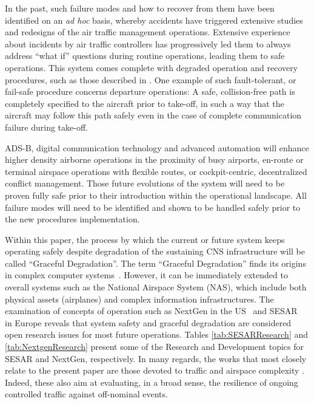 \documentclass[a4paper, 10pt]{IEEEtran}
\begin{document}
In the past, such failure modes and how to recover from them have been
identified on an {\em ad hoc} basis, whereby accidents have triggered
extensive studies and redesigns of the air traffic management operations.
Extensive experience about incidents by air traffic controllers has
progressively led them to always address ``what if'' questions during
routine operations, leading them to safe operations. This system comes
complete with degraded operation and recovery procedures, such as those
described in \cite{ICAO4444}. One example of such fault-tolerant, or fail-safe
procedure concerns departure operations: A safe, collision-free path is
completely specified to the aircraft prior to take-off, in such a way that
the aircraft may follow this path safely even in the case of complete
communication failure during take-off.


ADS-B, digital communication technology and advanced automation will enhance  higher density airborne operations
in the proximity of busy airports, en-route or terminal airspace operations
with flexible routes, or cockpit-centric, decentralized conflict
management. Those future evolutions of the system  will need to be proven fully safe prior to their
introduction within the operational landscape. All failure modes will need to be identified and shown to be handled safely prior to the new procedures implementation.

Within this paper, the process by which the current or future system keeps operating safely
despite degradation of the sustaining CNS infrastructure will be called
``Graceful Degradation''. The term ``Graceful Degradation'' finds its
origins in complex computer
systems~\cite{HerlihyGracefulDegradation}. However, it can be
immediately extended to overall systems such as the National Airspace System (NAS), which include both
physical assets (airplanes) and complex information infrastructures. The
examination of concepts of operation such as NextGen in the
US~\cite{nextGen} and SESAR~\cite{SESARdeliverable3, SESARconceptOfOperation} in Europe
reveals that system safety and graceful degradation are considered open
research issues for most future operations. Tables   \ref{tab:SESARResearch} and \ref{tab:NextgenResearch} present some of
the Research and Development topics for SESAR and NextGen, respectively. In many regards, the works that most closely relate to the present paper are those devoted to traffic and airspace complexity \cite{mogford1995cca,delahaye,keumjinLee,airspaceComplexitySridhar,complexityResolutionVersteegt,ishutkina2005dat}. Indeed, these also aim at evaluating, in a broad sense, the resilience of ongoing controlled traffic against off-nominal events. 
\end{document}

